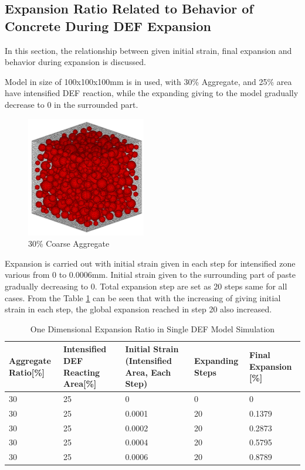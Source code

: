 \clearpage
\subsection{Expansion Ratio Related to Behavior of Concrete During DEF Expansion}

In this section, the relationship between given initial strain, final expansion and behavior during expansion is discussed.

Model in size of 100x100x100mm is in used, with 30\% Aggregate, and 25\% area have intensified DEF reaction, while the expanding giving to the model gradually decrease to 0 in the surrounded part.

\begin{figure}[ht]
\centering
\includegraphics[width=.3\linewidth]{Files/Aggregate/A30.png}
  \caption{30\% Coarse Aggregate}
  \label{fig:A30_model}
\end{figure}

Expansion is carried out with initial strain given in each step for intensified zone various from 0 to 0.0006mm. Initial strain given to the surrounding part of paste gradually decreasing to 0. Total expansion step are set as 20 steps same for all cases. From the Table \ref{table:DEF_X0C_EXP} can be seen that with the increasing of giving initial strain in each step, the global expansion reached in step 20 also increased.

\begin{table}[ht!]
\centering
\begin{tabular}{ ||p{2cm}|p{2cm}|p{2cm}|p{2cm}|p{2cm}|| }
 \hline
 Aggregate Ratio[\%] &  Intensified DEF Reacting Area[\%]  & Initial Strain (Intensified Area, Each Step) & Expanding Steps & Final Expansion [\%] \\ [0.5ex]
 \hline\hline
 30 & 25 & 0 & 0 & 0\\
 30 & 25 & 0.0001 & 20 & 0.1379\\
 30 & 25 & 0.0002 & 20 & 0.2873\\
 30 & 25 & 0.0004 & 20 & 0.5795\\
 30 & 25 & 0.0006 & 20 & 0.8789\\

 \hline
\end{tabular}
\caption{One Dimensional Expansion Ratio in Single DEF Model Simulation}
\label{table:DEF_X0C_EXP}
\end{table}

